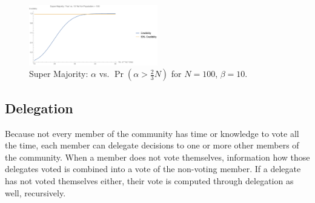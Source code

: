 \documentclass{sigchi}
\begin{document}
\begin{figure}[ht]
\centering
\includegraphics[width=0.5\textwidth]{figures/super_majority}
\caption{Super Majority: $\alpha$ vs. $\Pr(\alpha > \frac{2}{3}N)$ for $N=100$, $\beta = 10$.}
\label{super_majority}
\end{figure}


\subsection{Delegation}
Because not every member of the community has time or knowledge to vote all the time, each member can delegate
decisions to one or more other members of the community.
When a member does not vote themselves, information how those delegates voted is combined into a vote of
the non-voting member.
If a delegate has not voted themselves either, their vote is computed through delegation as well, recursively.
\end{document}

